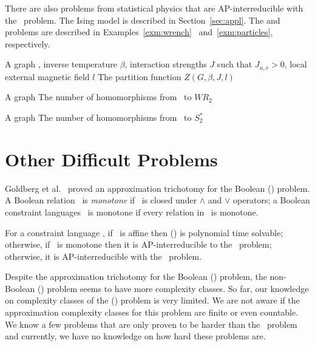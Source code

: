 There are also problems from statistical physics that are AP-interreducible with the \cbis\
problem. The Ising model is described in Section~\ref{sec:appl}.
The \pname{\#2-Wrench-Coloring}
and  problems are described in Examples~\ref{exm:wrench}~
and~\ref{exm:particles}, respectively.

{A graph \mG, inverse temperature \(\beta\), interaction strengths \(J\) such that
\(J_{u,v} > 0\), local external magnetic field \(l\)}
{The partition function \(Z(G,\beta,J,l)\)}

{A graph \mG}
{The number of homomorphisms from \mG\ to \(WR_2\)}

{A graph \mG}
{The number of homomorphisms from \mG\ to \(S^*_2\)}


\section{Other Difficult Problems}
Goldberg et al.~\cite{Trichotomy} proved an approximation trichotomy for the Boolean
\ccsp(\mrelset) problem. A Boolean relation \mR\ is \emph{monotone} if \mR\ is closed under
\(\land\) and \(\lor\) operators; a Boolean constraint languages \mrelset\ is monotone if 
every relation in \mrelset\ is monotone.


\begin{theorem}
For a constraint language \mrelset,
if \mrelset\ is affine then \ccsp(\mrelset) is polynomial time solvable; otherwise,
if \mrelset\ is monotone then it is AP-interreducible to the \cbis\ problem; otherwise,
it is AP-interreducible with the \csat\ problem.
\end{theorem}

Despite the approximation trichotomy for the Boolean \ccsp(\mrelset) problem,
the non-Boolean \ccsp(\mrelset) problem seems to have more complexity classes.
So far, our knowledge on complexity classes of the \ccsp(\mrelset) problem 
is very limited. We are not aware if the approximation
complexity classes for this problem are finite or even countable.
We know a few problems that are only proven to be harder than
the \cbis\ problem \cite{Leslie03} and currently, 
we have no knowledge on how hard these problems are.

